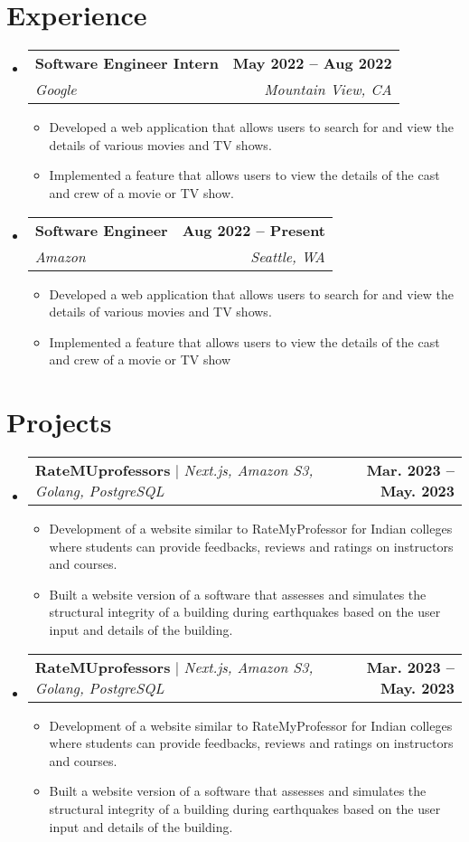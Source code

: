 \documentclass[letterpaper,11pt]{article}
\makeatletter
\newcommand{\resumeItem}[1]{
  \item\small{
    {#1 \vspace{-2pt}}
  }
}
\newcommand{\resumeSubheading}[4]{
  \vspace{-2pt}\item
    \begin{tabular*}{1.0\textwidth}[t]{l@{\extracolsep{\fill}}r}
      \textbf{#1} & \textbf{\small #2} \\
      \textit{\small#3} & \textit{\small #4} \\
    \end{tabular*}\vspace{-7pt}
}
\newcommand{\resumeProjectHeading}[2]{
    \item
    \begin{tabular*}{1.001\textwidth}{l@{\extracolsep{\fill}}r}
      \small#1 & \textbf{\small #2}\\
    \end{tabular*}\vspace{-7pt}
}
\newcommand{\resumeSubHeadingListStart}{\begin{itemize}[leftmargin=0.0in, label={}]}
\newcommand{\resumeSubHeadingListEnd}{\end{itemize}}
\newcommand{\resumeItemListStart}{\begin{itemize}}
\newcommand{\resumeItemListEnd}{\end{itemize}\vspace{-5pt}}
\makeatother
\begin{document}
\section{Experience}
  \resumeSubHeadingListStart
    \resumeSubheading
      { Software Engineer Intern}{ May 2022 -- Aug 2022 }
      { Google}{ Mountain View, CA}
      \resumeItemListStart
          \resumeItem{ Developed a web application that allows users to search for and view the details of various movies and TV shows. }
          \resumeItem{ Implemented a feature that allows users to view the details of the cast and crew of a movie or TV show. }
      \resumeItemListEnd
    \resumeSubheading
      { Software Engineer}{ Aug 2022 -- Present }
      { Amazon}{ Seattle, WA}
      \resumeItemListStart
          \resumeItem{ Developed a web application that allows users to search for and view the details of various movies and TV shows. }
          \resumeItem{ Implemented a feature that allows users to view the details of the cast and crew of a movie or TV show }
      \resumeItemListEnd
  \resumeSubHeadingListEnd
\vspace{-16pt}

\section{Projects}
    \vspace{-5pt}
    \resumeSubHeadingListStart
      \resumeProjectHeading
          {\textbf{ RateMUprofessors} $|$ \emph{ Next.js, Amazon S3, Golang, PostgreSQL}}{ Mar. 2023 -- May. 2023 }
          \resumeItemListStart
              \resumeItem{ Development of a website similar to RateMyProfessor for Indian colleges where students can provide feedbacks, reviews and ratings on instructors and courses. }
              \resumeItem{ Built a website version of a software that assesses and simulates the structural integrity of a building during earthquakes based on the user input and details of the building. }
          \resumeItemListEnd
        \vspace{-13pt}
      \resumeProjectHeading
          {\textbf{ RateMUprofessors} $|$ \emph{ Next.js, Amazon S3, Golang, PostgreSQL}}{ Mar. 2023 -- May. 2023 }
          \resumeItemListStart
              \resumeItem{ Development of a website similar to RateMyProfessor for Indian colleges where students can provide feedbacks, reviews and ratings on instructors and courses. }
              \resumeItem{ Built a website version of a software that assesses and simulates the structural integrity of a building during earthquakes based on the user input and details of the building. }
          \resumeItemListEnd
        \vspace{-13pt}
    \resumeSubHeadingListEnd
\vspace{-15pt}
\end{document}

